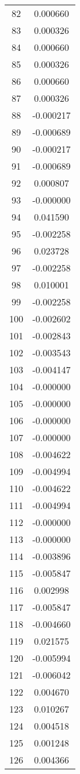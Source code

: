 \documentclass[12pt]{article}
\begin{document}
\begin{longtable}{@{}cc@{}}
82 & 0.000660 \\
83 & 0.000326 \\
84 & 0.000660 \\
85 & 0.000326 \\
86 & 0.000660 \\
87 & 0.000326 \\
88 & -0.000217 \\
89 & -0.000689 \\
90 & -0.000217 \\
91 & -0.000689 \\
92 & 0.000807 \\
93 & -0.000000 \\
94 & 0.041590 \\
95 & -0.002258 \\
96 & 0.023728 \\
97 & -0.002258 \\
98 & 0.010001 \\
99 & -0.002258 \\
100 & -0.002602 \\
101 & -0.002843 \\
102 & -0.003543 \\
103 & -0.004147 \\
104 & -0.000000 \\
105 & -0.000000 \\
106 & -0.000000 \\
107 & -0.000000 \\
108 & -0.004622 \\
109 & -0.004994 \\
110 & -0.004622 \\
111 & -0.004994 \\
112 & -0.000000 \\
113 & -0.000000 \\
114 & -0.003896 \\
115 & -0.005847 \\
116 & 0.002998 \\
117 & -0.005847 \\
118 & -0.004660 \\
119 & 0.021575 \\
120 & -0.005994 \\
121 & -0.006042 \\
122 & 0.004670 \\
123 & 0.010267 \\
124 & 0.004518 \\
125 & 0.001248 \\
126 & 0.004366 \\

\end{longtable}
\end{document}
